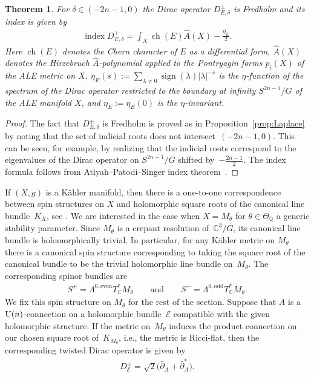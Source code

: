 \documentclass[pdftex]{sigma}
\numberwithin{equation}{section}
\newcommand{\cE}{\mathcal{E}}
\newcommand{\Q}{{\mathbb Q}}
\newcommand{\C}{{\mathbb C}}
\newcommand{\U}{{\rm U}}
\newcommand{\ch}{\operatorname{ch}}
\newcommand{\delbar}{\bar \del}
\newcommand{\del}{\partial}
\newcommand{\ind}{\mathop{\mathrm{index}}}
\newcommand{\sign}{\operatorname{sign}}
\newtheorem{Theorem}{Theorem}[section]
\begin{document}
\begin{Theorem}
  For $\delta\in(-2n-1,0)$ the Dirac operator $D^\pm_{E,\delta}$ is
  Fredholm and its index is given by
  \begin{gather}\label{eq:index-ale}
    \ind D^{+}_{E,\delta} = \int_X \ch(E) \hat{A}(X) - \frac{\eta_E}{2}.
  \end{gather}
  Here  $\ch(E)$ denotes the Chern character of $E$ as a differential form,
  $\hat{A}(X)$ denotes the Hirzebruch $\hat{A}$-polynomial
  applied to the Pontryagin forms $p_i(X)$ of the ALE metric on $X$,
   $\eta_E(s):=\sum\limits_{\lambda\neq 0}\sign(\lambda) |\lambda|^{-s}$ is
  the $\eta$-function of the spectrum of the Dirac operator restricted to
  the boundary at infinity $S^{2n-1}/G$ of the ALE manifold $X$, and
  $\eta_E:=\eta_E(0)$ is the $\eta$-invariant.
\end{Theorem}

\begin{proof}
  The fact that $D^\pm_{E,\delta}$ is Fredholm is proved as in
  Proposition~\ref{prop:Laplace} by noting that the set of indicial
  roots does not intersect~$(-2n-1, 0)$.  This can be seen, for
  example, by realizing that the indicial roots correspond to the
  eigenvalues of the Dirac operator on $S^{2n-1}/G$ shifted by~$-\frac{2n-1}{2}$.  The index formula follows from
  Atiyah--Patodi--Singer index theorem~\cite{Atiyah1975a}.
\end{proof}

If $(X,g)$ is a K\"ahler manifold, then there is a one-to-one
correspondence between spin structures on $X$ and holomorphic square
roots of the canonical line bundle~$K_X$,
see \cite[Theorem~2.2]{Hitchin1974}. We are interested in the case
when $X = M_{\theta}$ for $\theta \in \Theta_{\Q}$ a generic stability
parameter.  Since $M_\theta$ is a crepant resolution of~$\C^3/G$, its
canonical line bundle is holomorphically trivial.  In par\-ti\-cular, for
any K\"ahler metric on $M_\theta$ there is a canonical spin structure
corresponding to taking the square root of the canonical bundle to be
the trivial holomorphic line bundle on~$M_\theta$. The corresponding
spinor bundles are
\begin{gather*}
  S^{+} = \Lambda^{0,\text{even}} T_\C^*M_\theta \qquad\text{and}\qquad
  S^{-} = \Lambda^{0, \text{odd}} T_\C^*M_\theta.
\end{gather*}
We f\/ix this spin structure on $M_\theta$ for the rest of the section.
Suppose that $A$ is a $\U(n)$-connection on a holomorphic bundle~$\cE$
compatible with the given holomorphic structure.  If the metric on~$M_\theta$ induces the product connection on our chosen square root of~$K_{M_\theta}$,
i.e., the metric is Ricci-f\/lat, then the corresponding twisted Dirac
operator is given by
\begin{gather}\label{eq:D-1}
  D^\pm_{\cE} = \sqrt2 \big(\delbar_A + \delbar_A^*\big).
\end{gather}
\end{document}
